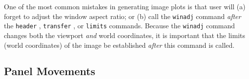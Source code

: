 One of the most common mistakes in generating image plots is that user
will (a) forget to adjust the window aspect ratio; or (b) call the
{\tt winadj} command {\em after} the
{\tt header}%
,
{\tt transfer}%
,
or
{\tt limits}%
commands.
Because the {\tt winadj} command changes both the
viewport
{\em and}
world
coordinates,
it is important that the limits (world coordinates) of the
image be established {\em after} this command is called.

\subsection*            {Panel Movements}

